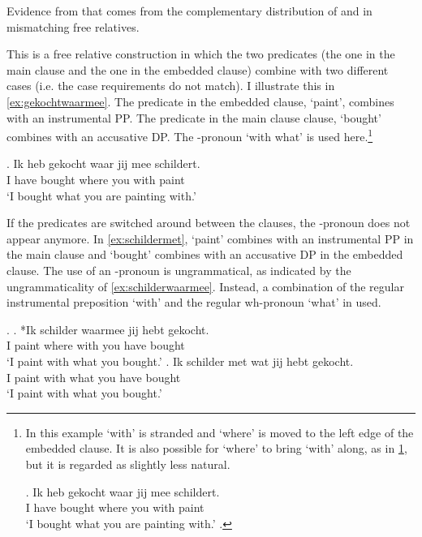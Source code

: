 \documentclass[12pt]{article}
\begin{document}
Evidence from that comes from the complementary distribution of  and  in mismatching free relatives.

This is a free relative construction in which the two predicates (the one in the main clause and the one in the embedded clause) combine with two different cases (i.e. the case requirements do not match). I illustrate this in \ref{ex:gekochtwaarmee}. The predicate in the embedded clause,  `paint', combines with an instrumental PP. The predicate in the main clause clause,  `bought' combines with an accusative DP. The -pronoun  `with what' is used here.\footnote{In this example  `with' is stranded and  `where' is moved to the left edge of the embedded clause. It is also possible for  `where' to bring  `with' along, as in \ref{ex:meealong}, but it is regarded as slightly less natural.

\exg. Ik heb gekocht waar jij mee schildert.\\
 I have bought where you with paint\\
 `I bought what you are painting with.'\label{ex:meealong}
\z.

\phantom{x}
}

\exg. Ik heb gekocht waar jij mee schildert.\\
 I have bought where you with paint\\
 `I bought what you are painting with.'\label{ex:gekochtwaarmee}

If the predicates are switched around between the clauses, the -pronoun does not appear anymore. In \ref{ex:schildermet},  `paint' combines with an instrumental PP in the main clause and  `bought' combines with an accusative DP in the embedded clause. The use of an -pronoun is ungrammatical, as indicated by the ungrammaticality of \ref{ex:schilderwaarmee}. Instead, a combination of the regular instrumental preposition  `with' and the regular wh-pronoun  `what' in used.

\ex.\label{ex:schildermet}
\ag. *Ik schilder waarmee jij hebt gekocht.\\
 I paint {where with} you have bought\\
 `I paint with what you bought.'\label{ex:schilderwaarmee}
\bg. Ik schilder met wat jij hebt gekocht.\\
 I paint with what you have bought\\
 `I paint with what you bought.'\label{ex:schildermetwat}
\end{document}
